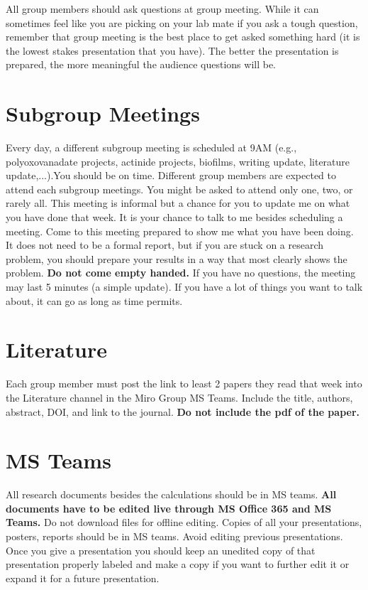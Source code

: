 \documentclass[letterpaper]{article}
\begin{document}
All group members should ask questions at group meeting. While it can sometimes feel like you are picking on your lab mate if you ask a tough question, remember that group meeting is the best place to get asked something hard (it is the lowest stakes presentation that you have). The better the presentation is prepared, the more meaningful the audience questions will be.  

\section*{Subgroup Meetings}
Every day, a different subgroup meeting is scheduled at 9AM (e.g., polyoxovanadate projects, actinide projects, biofilms, writing update, literature update,...).You should be on time. Different group members are expected to attend each subgroup meetings. You might be asked to attend only one, two, or rarely all. This meeting is informal but a chance for you to update me on what you have done that week. It is your chance to talk to me besides scheduling a meeting. Come to this meeting prepared to show me what you have been doing. It does not need to be a formal report, but if you are stuck on a research problem, you should prepare your results in a way that most clearly shows the problem. \textbf{Do not come empty handed.} If you have no questions, the meeting may last 5 minutes (a simple update). If you have a lot of things you want to talk about, it can go as long as time permits.

\section*{Literature}
Each group member must post the link to least 2 papers they read that week into the Literature channel in the Miro Group MS Teams. Include the title, authors, abstract, DOI, and link to the journal. \textbf{Do not include the pdf of the paper.} 

\section*{MS Teams}
All research documents besides the calculations should be in MS teams. \textbf{All documents have to be edited live through MS Office 365 and MS Teams.} Do not download files for offline editing. Copies of all your presentations, posters, reports should be in MS teams. Avoid editing previous presentations. Once you give a presentation you should keep an unedited copy of that presentation properly labeled and make a copy if you want to further edit it or expand it for a future presentation.
\end{document}
